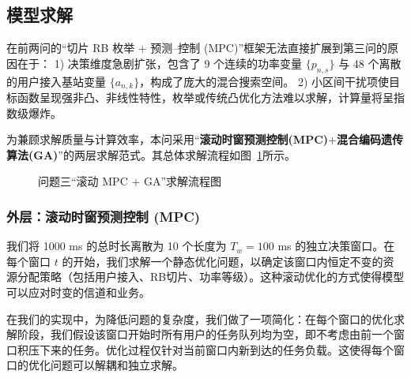 \subsection{模型求解}

在前两问的“切片 RB 枚举 + 预测–控制 (MPC)”框架无法直接扩展到第三问的原因在于：
1) 决策维度急剧扩张，包含了 9 个连续的功率变量 $\{p_{n,s}\}$ 与 48 个离散的用户接入基站变量 $\{a_{n,k}\}$，构成了庞大的混合搜索空间。
2) 小区间干扰项使目标函数呈现强非凸、非线性特性，枚举或传统凸优化方法难以求解，计算量将呈指数级爆炸。

为兼顾求解质量与计算效率，本问采用“\textbf{滚动时窗预测控制(MPC)}+\textbf{混合编码遗传算法(GA)}”的两层求解范式。其总体求解流程如图~\ref{fig:flow_q3}所示。

\begin{figure}[htbp]
  \centering
  \caption{问题三“滚动 MPC + GA”求解流程图}
  \label{fig:flow_q3}
\end{figure}

\subsubsection{外层：滚动时窗预测控制 (MPC)}
我们将 1000 ms 的总时长离散为 10 个长度为 $T_w=100$ ms 的独立决策窗口。在每个窗口 $t$ 的开始，我们求解一个静态优化问题，以确定该窗口内恒定不变的资源分配策略（包括用户接入、RB切片、功率等级）。这种滚动优化的方式使得模型可以应对时变的信道和业务。

在我们的实现中，为降低问题的复杂度，我们做了一项简化：在每个窗口的优化求解阶段，我们假设该窗口开始时所有用户的任务队列均为空，即不考虑由前一个窗口积压下来的任务。优化过程仅针对当前窗口内新到达的任务负载。这使得每个窗口的优化问题可以解耦和独立求解。

